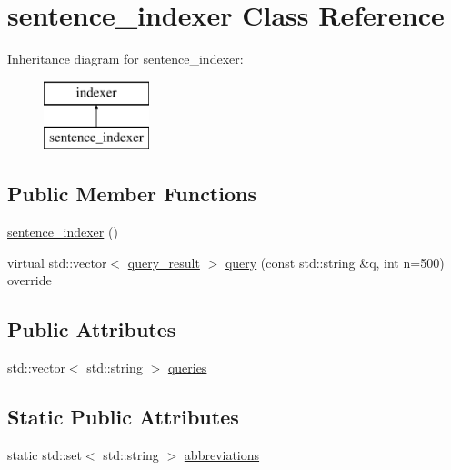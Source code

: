 \hypertarget{classsentence__indexer}{}\section{sentence\+\_\+indexer Class Reference}
\label{classsentence__indexer}
Inheritance diagram for sentence\+\_\+indexer\+:\begin{figure}[H]
\begin{center}
\leavevmode
\includegraphics[height=2.000000cm]{classsentence__indexer}
\end{center}
\end{figure}
\subsection*{Public Member Functions}
\begin{DoxyCompactItemize}
\item 
\hyperlink{classsentence__indexer_a365d5a760a116eb4f48fe8fdbdeb0421}{sentence\+\_\+indexer} ()
\item 
virtual std\+::vector$<$ \hyperlink{classquery__result}{query\+\_\+result} $>$ \hyperlink{classsentence__indexer_af2e0c3b623e5180ab8684e426962c531}{query} (const std\+::string \&q, int n=500) override
\end{DoxyCompactItemize}
\subsection*{Public Attributes}
\begin{DoxyCompactItemize}
\item 
std\+::vector$<$ std\+::string $>$ \hyperlink{classsentence__indexer_af3c7b09486d9cdfb49d6ebf7be6623c6}{queries}
\end{DoxyCompactItemize}
\subsection*{Static Public Attributes}
\begin{DoxyCompactItemize}
\item 
static std\+::set$<$ std\+::string $>$ \hyperlink{classsentence__indexer_abdcbe72e9fa681c5a59f4cfeb5c9dcbc}{abbreviations}
\end{DoxyCompactItemize}
